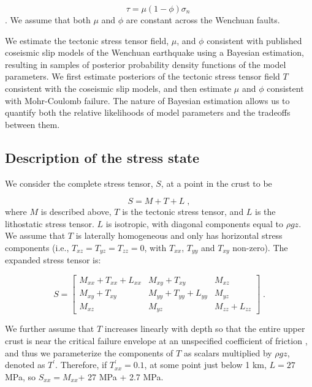 \documentclass[draft,jgrga]{AGUTeX}
\begin{document}
\begin{article}
\begin{equation} 
\tau = \mu (1 - \phi) \sigma_n \; 
\label{eqn:amonton} 
\end{equation}
\citep[e.g.,][]{sibson1985}. We assume that both $\mu$ and $\phi$ are
constant across the Wenchuan faults.

We estimate the tectonic stress tensor field, $\mu$, and $\phi$
consistent with published coseismic slip models of the Wenchuan
earthquake using a Bayesian estimation, resulting in samples of posterior probability 
density functions of the model parameters. 
We first estimate posteriors of the tectonic stress tensor field 
$T$ consistent with
the coseismic slip models, and then estimate $\mu$ and $\phi$ consistent
with Mohr-Coulomb failure. The nature of Bayesian estimation allows us
to quantify both the relative likelihoods of model parameters and the
tradeoffs between them.

\subsection{Description of the stress
state}\label{description-of-the-stress-state}

We consider the complete stress tensor, $S$, at a point in the crust to
be

\begin{equation}
S = M + T + L \; ,
\end{equation}
where $M$ is described above, $T$ is the tectonic stress tensor, and $L$
is the lithostatic stress tensor. $L$ is isotropic, with diagonal
components equal to $\rho g z$. We assume that $T$ is laterally
homogeneous and only has horizontal stress components (i.e.,
$T_{xz} = T_{yz} = T_{zz} = 0$, with $T_{xx}$, $T_{yy}$ and $T_{xy}$
non-zero). The expanded stress tensor is:

\begin{equation}
S = \begin{bmatrix}
  M_{xx} + T_{xx} + L_{xx} & M_{xy} + T_{xy} &  M_{xz} \\
	M_{xy} + T_{xy} &  M_{yy} + T_{yy} + L_{yy} & M_{yz} \\
	M_{xz}     &  M_{yz}  &  M_{zz} + L_{zz}
	\end{bmatrix} \; .
\label{eqn:stress_tensor}
\end{equation}

We further assume that $T$ increases linearly with depth so
that the entire upper crust is near the critical failure envelope
at an unspecified coefficient of friction
\citep[e.g.,][]{townend2000}, and thus we parameterize the components of $T$
as scalars multiplied by $\rho g z$, denoted as $T^\prime$. Therefore, if
$T^\prime_{xx} = 0.1$, at some point just below 1 km, $L=27$ MPa, so
$S_{xx} = M_{xx}$+ 27 MPa + 2.7 MPa.




\end{article}
\end{document}
